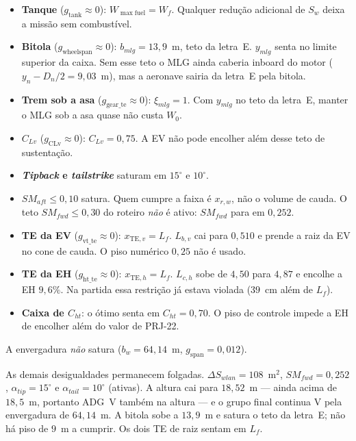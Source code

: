 \begin{itemize}
\item \textbf{Tanque} ($g_{\mathrm{tank}}\approx 0$): $W_{\max\mathrm{fuel}}=W_f$.
      Qualquer redução adicional de $S_w$ deixa a missão sem
      combustível.
\item \textbf{Bitola} ($g_{\mathrm{wheelspan}}\approx 0$): $b_{mlg}=13{,}9$~m,
      teto da letra~E. $y_{mlg}$ senta no limite superior da caixa. Sem
      esse teto o MLG ainda caberia inboard do motor ($y_n-D_n/2=9{,}03$~m),
      mas a aeronave sairia da letra~E pela bitola.
\item \textbf{Trem sob a asa} ($g_{\mathrm{gear\_te}}\approx 0$):
      $\xi_{mlg}=1$. Com $y_{mlg}$ no teto da letra~E, manter o MLG sob a
      asa quase não custa $W_0$.
\item \textbf{$C_{Lv}$} ($g_{\mathrm{CLv}}\approx 0$): $C_{Lv}=0{,}75$.
      A EV não pode encolher além desse teto de sustentação.
\item \textbf{\emph{Tipback} e \emph{tailstrike}} saturam em $15^\circ$ e
      $10^\circ$.
\item \textbf{$SM_{aft}\le 0{,}10$} satura. Quem cumpre a faixa é
      $x_{r,w}$, não o volume de cauda. O teto $SM_{fwd}\le 0{,}30$ do
      roteiro \emph{não} é ativo: $SM_{fwd}$ para em $0{,}252$.
\item \textbf{TE da EV} ($g_{\mathrm{vt\_te}}\approx 0$):
      $x_{\mathrm{TE},v}=L_f$. $L_{b,v}$ cai para $0{,}510$ e prende a
      raiz da EV no cone de cauda. O piso numérico $0{,}25$ não é usado.
\item \textbf{TE da EH} ($g_{\mathrm{ht\_te}}\approx 0$):
      $x_{\mathrm{TE},h}=L_f$. $L_{c,h}$ sobe de $4{,}50$ para $4{,}87$ e
      encolhe a EH $9{,}6\%$. Na partida essa restrição já estava
      violada ($39$~cm além de $L_f$).
\item \textbf{Caixa de $C_{ht}$}: o ótimo senta em $C_{ht}=0{,}70$.
      O piso de controle impede a EH de encolher além do valor de PRJ-22.
\end{itemize}

A envergadura \emph{não} satura ($b_w=64{,}14$~m, $g_{\mathrm{span}}=0{,}012$).

As demais desigualdades permanecem folgadas.
$\Delta S_{wlan}=108$~m$^2$, $SM_{fwd}=0{,}252$,
$\alpha_{tip}=15^\circ$ e $\alpha_{tail}=10^\circ$ (ativas). A altura cai
para $18{,}52$~m --- ainda acima de $18{,}5$~m, portanto ADG~V também na
altura --- e o grupo final continua V pela envergadura de $64{,}14$~m. A bitola
sobe a $13{,}9$~m e satura o teto da letra~E; não há piso de $9$~m a
cumprir. Os dois TE de raiz sentam em $L_f$.

